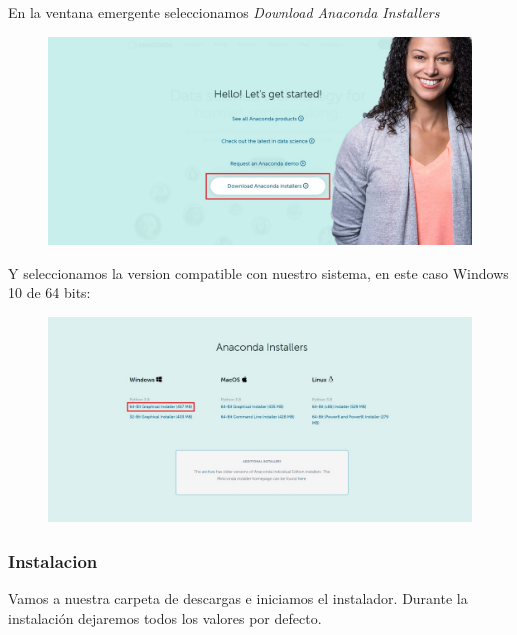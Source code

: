 \documentclass[a4paper,10pt]{article}
\begin{document}
\clearpage

En la ventana emergente seleccionamos \textit{Download Anaconda Installers}

\begin{figure}[H]
\begin{center}
\includegraphics[width=450pt]{./fotos/introduccion/web Anaconda 2.jpg}
\end{center}
\end{figure}

Y seleccionamos la version compatible con nuestro sistema, en este caso Windows 10 de 64 bits:

\begin{figure}[H]
\begin{center}
\includegraphics[width=450pt]{./fotos/introduccion/web Anaconda 3.jpg}
\end{center}
\end{figure}

\clearpage

\subsubsection{Instalacion}

Vamos a nuestra carpeta de descargas e iniciamos el instalador. Durante la instalación dejaremos todos los valores por defecto.
\end{document}
